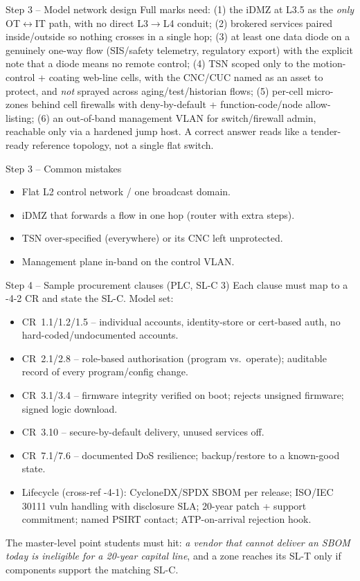 \documentclass[11pt,a4paper]{article}
\begin{document}
\begin{solutionbox}{Step 3 -- Model network design}
Full marks need: (1) the iDMZ at L3.5 as the \emph{only} OT$\leftrightarrow$IT
path, with no direct L3$\to$L4 conduit; (2) brokered services paired
inside/outside so nothing crosses in a single hop; (3) at least one data
diode on a genuinely one-way flow (SIS/safety telemetry, regulatory
export) with the explicit note that a diode means no remote control;
(4) TSN scoped only to the motion-control + coating web-line cells, with
the CNC/CUC named as an asset to protect, and \emph{not} sprayed across
aging/test/historian flows; (5) per-cell micro-zones behind cell
firewalls with deny-by-default + function-code/node allow-listing; (6)
an out-of-band management VLAN for switch/firewall admin, reachable only
via a hardened jump host. A correct answer reads like a tender-ready
reference topology, not a single flat switch.
\end{solutionbox}

\begin{solutionbox}{Step 3 -- Common mistakes}
\begin{itemize}\setlength{\itemsep}{1pt}
  \item Flat L2 control network / one broadcast domain.
  \item iDMZ that forwards a flow in one hop (router with extra steps).
  \item TSN over-specified (everywhere) or its CNC left unprotected.
  \item Management plane in-band on the control VLAN.
\end{itemize}
\end{solutionbox}

\begin{solutionbox}{Step 4 -- Sample procurement clauses (PLC, SL-C 3)}
Each clause must map to a -4-2 CR and state the SL-C. Model set:
\begin{itemize}\setlength{\itemsep}{1pt}
  \item CR~1.1/1.2/1.5 -- individual accounts, identity-store or
    cert-based auth, no hard-coded/undocumented accounts.
  \item CR~2.1/2.8 -- role-based authorisation (program vs.\ operate);
    auditable record of every program/config change.
  \item CR~3.1/3.4 -- firmware integrity verified on boot; rejects
    unsigned firmware; signed logic download.
  \item CR~3.10 -- secure-by-default delivery, unused services off.
  \item CR~7.1/7.6 -- documented DoS resilience; backup/restore to a
    known-good state.
  \item Lifecycle (cross-ref -4-1): CycloneDX/SPDX SBOM per release;
    ISO/IEC 30111 vuln handling with disclosure SLA; 20-year patch +
    support commitment; named PSIRT contact; ATP-on-arrival rejection
    hook.
\end{itemize}
The master-level point students must hit: \emph{a vendor that cannot
deliver an SBOM today is ineligible for a 20-year capital line}, and a
zone reaches its SL-T only if components support the matching SL-C.
\end{solutionbox}
\end{document}
